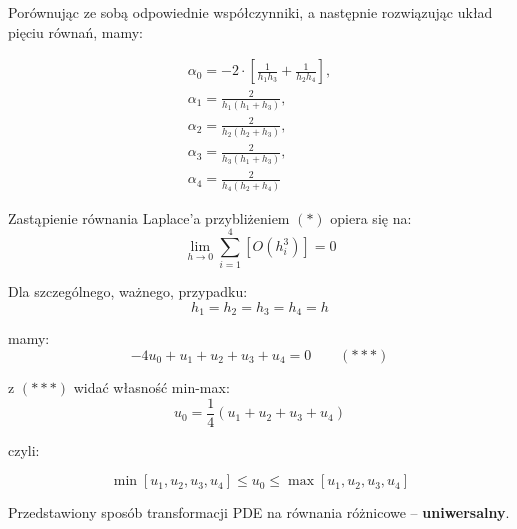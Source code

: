 \begin{frame}
  Porównując ze sobą odpowiednie współczynniki, a następnie rozwiązując układ pięciu równań, mamy:
  \begin{block}{}
    $$ \begin{array}{l}
    \alpha_0 = -2 \cdot \left[ \frac{1}{h_1 h_3} + \frac{1}{h_2 h_4} \right], \\
    \alpha_1 = \frac{2}{h_1 (h_1 + h_3)}, \\
    \alpha_2 = \frac{2}{h_2 (h_2 + h_3)}, \\ %
    \alpha_3 = \frac{2}{h_3 (h_1 + h_3)}, \\
    \alpha_4 = \frac{2}{h_4 (h_2 + h_4)}
    \end{array}$$
  \end{block}

  Zastąpienie równania Laplace'a przybliżeniem $(*)$ opiera się na:
  $$ \lim_{h \rightarrow 0} \sum_{i=1}^4 [O(h_i^3)] = 0$$ %
\end{frame}

\begin{frame}
  Dla szczególnego, ważnego, przypadku:
  $$ h_1 = h_2 = h_3 = h_4 = h $$

  mamy:
  $$ -4 u_0 + u_1 + u_2 + u_3 + u_4 = 0 \qquad (***) $$

  z $(***)$ widać własność min-max:
  $$ u_0 = \frac{1}{4} (u_1 + u_2 + u_3 + u_4) $$

  czyli:
  \begin{block}{}
    $$ \min[u_1, u_2, u_3, u_4] \le u_0 \le \max[u_1, u_2, u_3, u_4] $$
  \end{block}

  Przedstawiony sposób transformacji PDE na równania różnicowe -- \textbf{uniwersalny}.
\end{frame}
